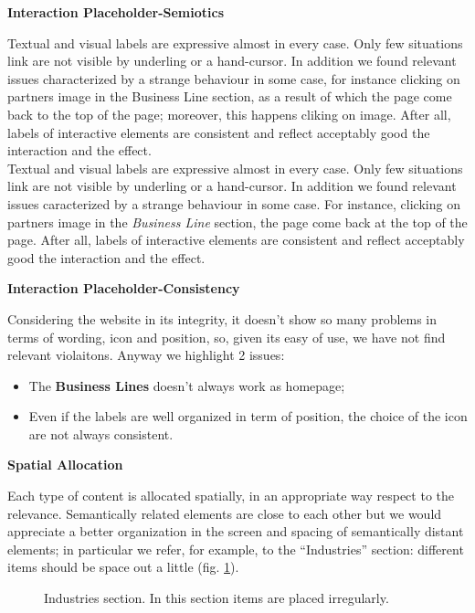 \textbf{Interaction Placeholder-Semiotics}\par
Textual and visual labels are expressive almost in every case. Only few situations link are not visible by underling or a hand-cursor. In addition we found relevant issues characterized by a strange behaviour in some case, for instance clicking on partners image in the Business Line section, as a result of which the page come back to the top of the page; moreover, this happens cliking on image. After all, labels of interactive elements are consistent and reflect acceptably good the interaction and the effect.\\
Textual and visual labels are expressive almost in every case. Only few situations link are not visible by underling or a hand-cursor. In addition we found relevant issues caracterized by a strange behaviour in some case. For instance, clicking on partners image in the \textit{Business Line} section, the page come back at the top of the page. 
After all, labels of interactive elements are consistent and reflect acceptably good the interaction and the effect.
\medskip

\textbf{Interaction Placeholder-Consistency}\par
Considering the website in its integrity, it doesn’t show so many problems in terms of wording, icon and position, so, given its easy of use, we have not find relevant violaitons. 
Anyway we highlight 2 issues:
\begin{itemize}
\item The \textbf{Business Lines} doesn’t always work as homepage;
\item Even if the labels are well organized in term of position, the choice of the icon are not always consistent.
\end{itemize}
\medskip
\pagebreak
\textbf{Spatial Allocation}\par
Each type of content is allocated spatially, in an appropriate way respect to the relevance. Semantically related elements are close to each other but we would appreciate a better organization in the screen and spacing of semantically distant elements; in particular we refer, for example, to the “Industries” section: different items should be space out a little (fig. \ref{space}). 

\begin{figure}[H]
  \centering
    \caption{Industries section. In this section items are placed irregularly.}
    \label{space}
\end{figure}



